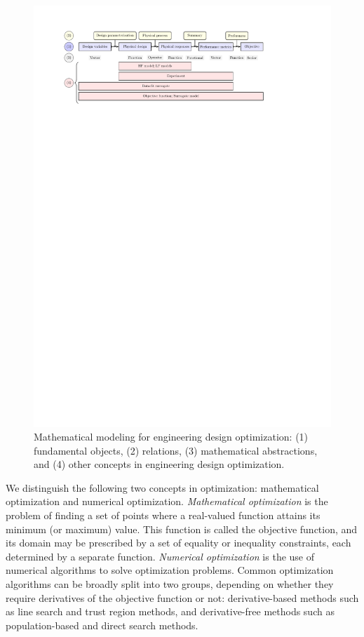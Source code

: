 \documentclass[iicol,sn-basic]{sn-jnl}%
\begin{document}
\begin{figure}
	\centering
	\includegraphics[scale=0.75]{Fig1.pdf}
	\caption{Mathematical modeling for engineering design optimization: (1) fundamental objects, (2) relations, (3) mathematical abstractions, and (4) other concepts in engineering design optimization.}
	\label{Fig0}
\end{figure}

We distinguish the following two concepts in optimization: mathematical optimization and numerical optimization.
\textit{Mathematical optimization} is the problem of finding a set of points where a real-valued function attains its minimum (or maximum) value.
This function is called the objective function, and its domain may be prescribed by a set of equality or inequality constraints, each determined by a separate function.
\textit{Numerical optimization} is the use of numerical algorithms to solve optimization problems.
Common optimization algorithms can be broadly split into two groups, depending on whether they require derivatives of the objective function or not: derivative-based methods such as line search and trust region methods, and derivative-free methods such as population-based and direct search methods.
\end{document}
